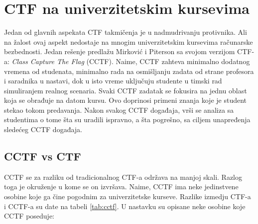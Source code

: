 \documentclass[12pt, a4paper, twocolumn]{article}
\begin{document}
\section{CTF na univerzitetskim kursevima}

Jedan od glavnih aspekata CTF takmičenja je u nadmudrivanju protivnika. Ali na
žalost ovaj aspekt nedostaje na mnogim univerzitetskim kursevima računarske
bezbednosti. Jedan rešenje predlažu Mirković i Piterson \cite{ctf_class} sa
svojom verzijom CTF-a: \emph{Class Capture The Flag} (CCTF). Naime, CCTF
zahteva minimalno dodatnog vremena od studenata, minimalno rada na 
osmišljanju zadata od strane profesora i saradnika u nastavi, dok u isto
vreme uključuju studente u timski rad simuliranjem realnog scenaria.
Svaki CCTF zadatak se fokusira na jednu oblast koja se obrađuje na datom 
kursu. Ovo doprinosi primeni znanja koje je student stekao tokom predavanja.
Nakon svakog CCTF događaja, vrši se analiza sa studentima o tome šta su
uradili ispravno, a šta pogrešno, sa ciljem unapređenja sledećeg CCTF 
događaja. 

\subsection{CCTF vs CTF}

CCTF se za razliku od tradicionalnog CTF-a održava na manjoj skali. Razlog 
toga je okruženje u kome se on izvršava. Naime, CCTF ima neke jedinstvene
osobine koje ga čine pogodnim za univerzitetske kurseve. Razlike izmedju
CTF-a i CCTF-a su date na tabeli \ref{tab:cctf}. U nastavku su opisane neke 
osobine koje CCTF poseduje:

\begin{table}[!h]
    \centering
    \caption{Upoređivanje CTF-a i CCTF-a.}\label{tab:cctf}
\end{table}
\end{document}
